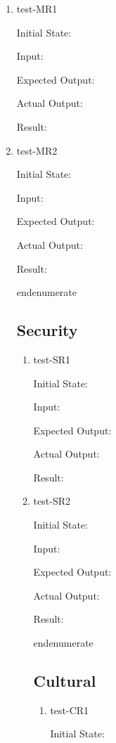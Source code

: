 \documentclass[12pt, titlepage]{article}
\begin{document}
\begin{enumerate}
\begin{enumerate}
\begin{enumerate}
\begin{enumerate}
\begin{enumerate}

  \item{test-MR1} \label{test-MR1}

  Initial State:

  Input:

  Expected Output:

  Actual Output:

  Result:

  \item{test-MR2} \label{test-MR2}

  Initial State:

  Input:

  Expected Output:

  Actual Output:

  Result:

end{enumerate}

\subsection{Security} \label{section:4.6}

\begin{enumerate}

  \item{test-SR1} \label{test-SR1}

  Initial State:

  Input:

  Expected Output:

  Actual Output:

  Result:

  \item{test-SR2} \label{test-SR2}

  Initial State:

  Input:

  Expected Output:

  Actual Output:

  Result:

end{enumerate}

\subsection{Cultural} \label{section:4.7}

\begin{enumerate}

  \item{test-CR1} \label{test-CR1}

  Initial State:


\end{enumerate}
\end{enumerate}
\end{enumerate}
\end{enumerate}
\end{enumerate}
\end{enumerate}
\end{enumerate}
\end{document}
